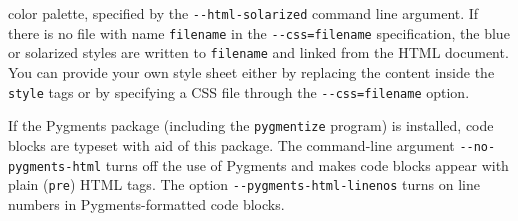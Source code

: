 \documentclass[%
oneside,                 %
final,                   %
10pt]{article}
\begin{document}
color palette, specified by the {\fontsize{10pt}{10pt}\Verb!--html-solarized!} command line
argument. If there is no file with name {\fontsize{10pt}{10pt}\Verb!filename!} in the {\fontsize{10pt}{10pt}\Verb!--css=filename!}
specification, the blue or solarized styles are written to {\fontsize{10pt}{10pt}\Verb!filename!}
and linked from the HTML document. You can provide your own style sheet
either by replacing the content inside the {\fontsize{10pt}{10pt}\Verb!style!} tags or by
specifying a CSS file through the {\fontsize{10pt}{10pt}\Verb!--css=filename!} option.

If the Pygments package (including the {\fontsize{10pt}{10pt}\Verb!pygmentize!} program)
is installed, code blocks are typeset with
aid of this package. The command-line argument {\fontsize{10pt}{10pt}\Verb!--no-pygments-html!}
turns off the use of Pygments and makes code blocks appear with
plain ({\fontsize{10pt}{10pt}\Verb!pre!}) HTML tags. The option {\fontsize{10pt}{10pt}\Verb!--pygments-html-linenos!} turns
on line numbers in Pygments-formatted code blocks.
\end{document}
